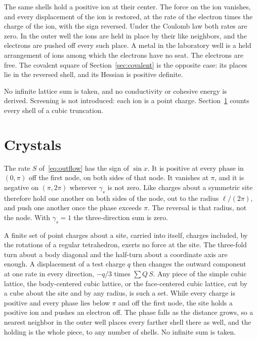 \documentclass[a4paper]{article}
\begin{document}
The same shells hold a positive ion at their center. The force on the ion vanishes, and every displacement of the ion is restored, at the rate of the electron times the charge of the ion, with the sign reversed. Under the Coulomb law both rates are zero. In the outer well the ions are held in place by their like neighbors, and the electrons are pushed off every such place. A metal in the laboratory well is a held arrangement of ions among which the electrons have no seat. The electrons are free. The covalent square of Section~\ref{sec:covalent} is the opposite case: its places lie in the reversed shell, and its Hessian is positive definite.

No infinite lattice sum is taken, and no conductivity or cohesive energy is derived. Screening is not introduced: each ion is a point charge. Section~\ref{sec:crystal} counts every shell of a cubic truncation.

\section{Crystals}
\label{sec:crystal}

The rate \(S\) of~\eqref{eq:outflow} has the sign of \(\sin x\). It is positive at every phase in \((0,\pi)\) off the first node, on both sides of that node. It vanishes at \(\pi\), and it is negative on \((\pi,2\pi)\) wherever \(\gamma_s\) is not zero. Like charges about a symmetric site therefore hold one another on both sides of the node, out to the radius \(\ell/(2\pi)\), and push one another once the phase exceeds \(\pi\). The reversal is that radius, not the node. With \(\gamma_s=1\) the three-direction sum is zero.

A finite set of point charges about a site, carried into itself, charges included, by the rotations of a regular tetrahedron, exerts no force at the site. The three-fold turn about a body diagonal and the half-turn about a coordinate axis are enough. A displacement of a test charge \(q\) then changes the outward component at one rate in every direction, \(-q/3\) times \(\sum Q\,S\). Any piece of the simple cubic lattice, the body-centered cubic lattice, or the face-centered cubic lattice, cut by a cube about the site and by any radius, is such a set. While every charge is positive and every phase lies below \(\pi\) and off the first node, the site holds a positive ion and pushes an electron off. The phase falls as the distance grows, so a nearest neighbor in the outer well places every farther shell there as well, and the holding is the whole piece, to any number of shells. No infinite sum is taken.
\end{document}
